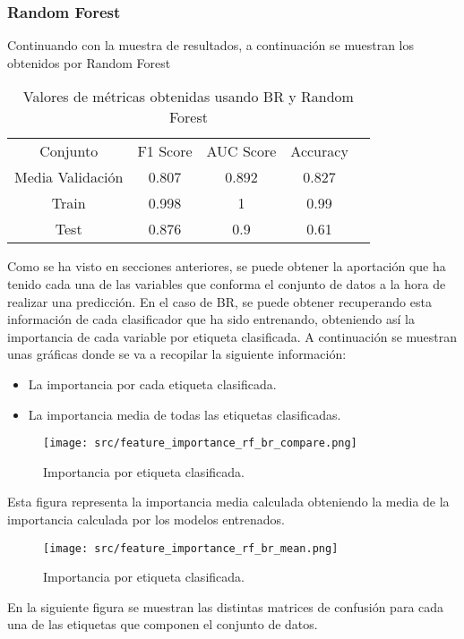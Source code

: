 \subsubsection*{Random Forest}
Continuando con la muestra de resultados, a continuación se muestran los obtenidos por Random Forest
\begin{table}[H]
	\centering
	\begin{tabular}{|c|c|c|c|c}
		\cline{1-4}
		Conjunto         & F1 Score & AUC Score & Accuracy \\ \cline{1-4}
		Media Validación & 0.807    & 0.892     & 0.827    \\ \cline{1-4}
		Train            & 0.998    & 1         & 0.99     \\ \cline{1-4}
		Test             & 0.876    & 0.9       & 0.61     \\ \cline{1-4}
	\end{tabular}
	\caption{Valores de métricas obtenidas usando BR y Random Forest}
\end{table}
Como se ha visto en secciones anteriores, se puede obtener la aportación que ha tenido cada una de las variables que conforma el conjunto de datos a la hora de realizar una predicción. En el caso de BR, se puede obtener recuperando esta información de cada clasificador que ha sido entrenando, obteniendo así la importancia de cada variable por etiqueta clasificada.
A continuación se muestran unas gráficas donde se va a recopilar la siguiente información: \linebreak
\begin{itemize}
	\item La importancia por cada etiqueta clasificada.
	\item La importancia media de todas las etiquetas clasificadas.
\end{itemize}
\begin{figure}[H]
	\centering
	\texttt{[image: src/feature\_importance\_rf\_br\_compare.png]}
	\caption{Importancia por etiqueta clasificada.}
	\label{fig:rf_br_label}
\end{figure}
Esta figura representa la importancia media calculada obteniendo la media de la importancia calculada por los modelos entrenados.
\begin{figure}[H]
	\centering
	\texttt{[image: src/feature\_importance\_rf\_br\_mean.png]}
	\caption{Importancia por etiqueta clasificada.}
	\label{fig:rf_br_mean}
\end{figure}
En la siguiente figura se muestran las distintas matrices de confusión para cada una de las etiquetas que componen el conjunto de datos.\linebreak
